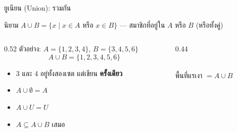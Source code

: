 \begin{frame}{ยูเนียน (Union): รวมกัน}
  \begin{block}{นิยาม}
    $A \cup B = \{x \mid x \in A \text{ หรือ } x \in B\}$ --- สมาชิกที่อยู่ใน $A$ หรือ $B$ (หรือทั้งคู่)
  \end{block}
  \begin{columns}[T]
    \begin{column}{0.52\textwidth}
      ตัวอย่าง: $A = \{1,2,3,4\}$, $B = \{3,4,5,6\}$
      \[ A \cup B = \{1,2,3,4,5,6\} \]
      \begin{itemize}\small
        \item 3 และ 4 อยู่ทั้งสองเซต แต่เขียน \textbf{ครั้งเดียว}
        \item $A \cup \emptyset = A$ 
        \item $A \cup U = U$ 
        \item $A \subseteq A \cup B$ เสมอ
      \end{itemize}
    \end{column}
    \begin{column}{0.44\textwidth}
      \begin{center}
      \\
      พื้นที่แรเงา $= A \cup B$
      \end{center}
    \end{column}
  \end{columns}
\end{frame}


